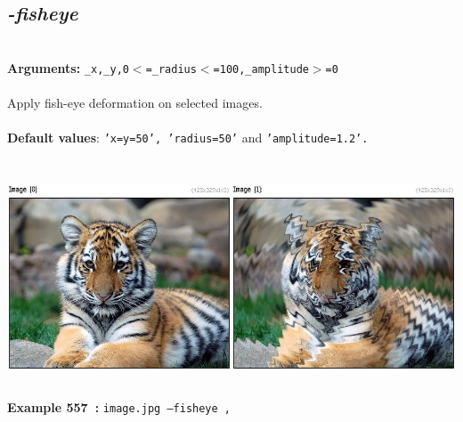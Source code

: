 \documentclass[a4paper,11pt,twoside]{book}
\begin{document}
\subsection{\emph{-fisheye} }\vspace*{-0.5em}
~\\\textbf{Arguments: } 
{\small \texttt{\_x,\_y,0$<$=\_radius$<$=100,\_amplitude$>$=0}}\\~\\
Apply fish-eye deformation on selected images.
~\\~\\\textbf{Default values}: {\small \texttt{'x=y=50', 'radius=50'} and \texttt{'amplitude=1.2'.}}
\begin{center}\includegraphics[keepaspectratio=true,height=7cm,width=\textwidth]{img/gmic_def557.jpg}\\
{\footnotesize \textbf{Example 557~:} \texttt{image.jpg --fisheye ,}}
\end{center}
\end{document}
